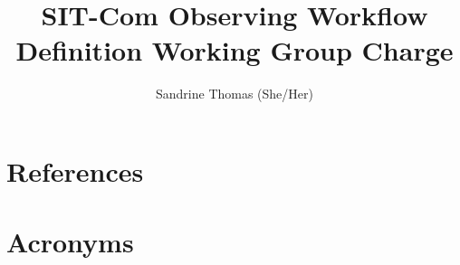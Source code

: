 \documentclass[SE,authoryear,toc]{lsstdoc}
\title{SIT-Com Observing Workflow Definition Working Group Charge}
\author{%
Sandrine Thomas (She/Her)
}
\date{\vcsDate}
\begin{document}
\maketitle


\appendix
\section{References} \label{sec:bib}
\renewcommand{\refname}{} %


\section{Acronyms} \label{sec:acronyms}

\end{document}
